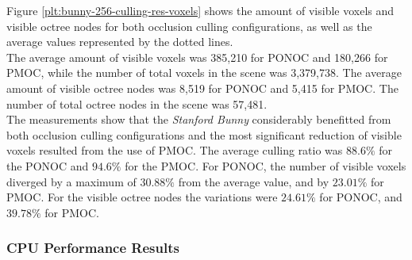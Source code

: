 \noindent
Figure \ref{plt:bunny-256-culling-res-voxels} shows the amount of visible voxels and visible 
octree nodes for both occlusion culling configurations, as well as the average values represented 
by the dotted lines. \\

\noindent
The average amount of visible voxels was 385,210 for \ac{PONOC} and 180,266 for \ac{PMOC},
while the number of total voxels in the scene was 3,379,738. The average amount of visible 
octree nodes was 8,519 for \ac{PONOC} and 5,415 for \ac{PMOC}. The number of total octree 
nodes in the scene was 57,481. \\

\noindent
The measurements show that the \emph{Stanford Bunny} considerably benefitted from both occlusion 
culling configurations and the most significant reduction of visible voxels resulted from the use 
of \ac{PMOC}. The average culling ratio was $88.6\%$ for the \ac{PONOC} and $94.6\%$ for the 
\ac{PMOC}. For \ac{PONOC}, the number of visible voxels diverged by a maximum of $30.88\%$ from 
the average value, and by $23.01\%$ for \ac{PMOC}. For the visible octree nodes the variations were 
$24.61\%$ for \ac{PONOC}, and $39.78\%$ for \ac{PMOC}.

\subsubsection*{CPU Performance Results} \label{subsubsec-cpu-performance-results-bunny}

